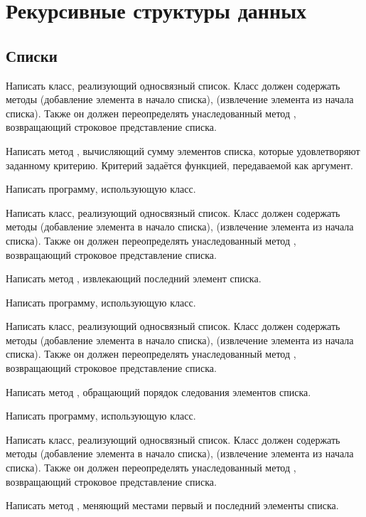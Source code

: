 \section{Рекурсивные структуры данных}

\subsection{Списки}

\task Написать класс, реализующий односвязный список. Класс должен
содержать методы  (добавление элемента в начало списка),
 (извлечение элемента из начала списка). Также он должен
переопределять унаследованный метод , возвращающий
строковое представление списка.

Написать метод , вычисляющий сумму элементов списка, которые
удовлетворяют заданному критерию. Критерий задаётся функцией,
передаваемой как аргумент.

Написать программу, использующую класс.

\task Написать класс, реализующий односвязный список. Класс должен
содержать методы  (добавление элемента в начало списка),
 (извлечение элемента из начала списка). Также он должен
переопределять унаследованный метод , возвращающий
строковое представление списка.

Написать метод , извлекающий последний элемент списка.

Написать программу, использующую класс.

\task Написать класс, реализующий односвязный список. Класс должен
содержать методы  (добавление элемента в начало списка),
 (извлечение элемента из начала списка). Также он должен
переопределять унаследованный метод , возвращающий
строковое представление списка.

Написать метод , обращающий порядок следования элементов
списка.

Написать программу, использующую класс.

\task Написать класс, реализующий односвязный список. Класс должен
содержать методы  (добавление элемента в начало списка),
 (извлечение элемента из начала списка). Также он должен
переопределять унаследованный метод , возвращающий
строковое представление списка.

Написать метод , меняющий местами первый и последний
элементы списка.

